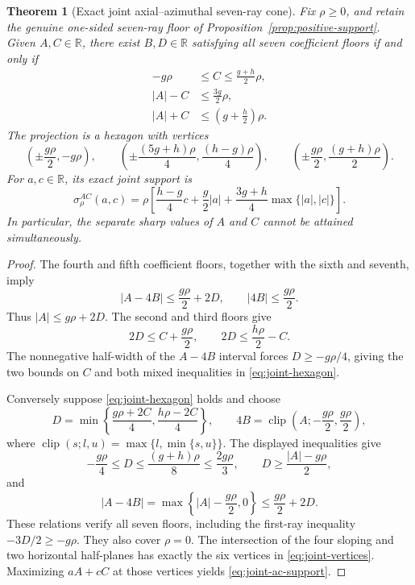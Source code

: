 \documentclass[11pt,a4paper]{article}
\theoremstyle{plain}
\newtheorem{theorem}{Theorem}[section]
\theoremstyle{definition}
\newcommand{\R}{\mathbb{R}}
\begin{document}
\begin{theorem}[Exact joint axial--azimuthal seven-ray cone]
\label{thm:joint-ac-cone}
Fix $\rho\ge0$, and retain the genuine one-sided seven-ray floor of
Proposition~\ref{prop:positive-support}. Given $A,C\in\R$, there exist
$B,D\in\R$ satisfying all seven coefficient floors if and only if
\begin{equation}\label{eq:joint-hexagon}
 \begin{split}
  -g\rho&\le C\le\frac{g+h}{2}\rho,\\
  |A|-C&\le\frac{3g}{2}\rho,\\
  |A|+C&\le\left(g+\frac h2\right)\rho.
 \end{split}
\end{equation}
The projection is a hexagon with vertices
\begin{equation}\label{eq:joint-vertices}
 \left(\pm\frac{g\rho}{2},-g\rho\right),\qquad
 \left(\pm\frac{(5g+h)\rho}{4},\frac{(h-g)\rho}{4}\right),\qquad
 \left(\pm\frac{g\rho}{2},\frac{(g+h)\rho}{2}\right).
\end{equation}
For $a,c\in\R$, its exact joint support is
\begin{equation}\label{eq:joint-ac-support}
 \sigma^{AC}_{\rho}(a,c)=\rho\left[
 \frac{h-g}{4}c+\frac g2|a|
 +\frac{3g+h}{4}\max\{|a|,|c|\}\right].
\end{equation}
In particular, the separate sharp values of $A$ and $C$ cannot
be attained simultaneously.
\end{theorem}

\begin{proof}
The fourth and fifth coefficient floors, together with the sixth and
seventh, imply
\[
 |A-4B|\le\frac{g\rho}{2}+2D,\qquad
 |4B|\le\frac{g\rho}{2}.
\]
Thus $|A|\le g\rho+2D$. The second and third floors give
\[
 2D\le C+\frac{g\rho}{2},\qquad
 2D\le\frac{h\rho}{2}-C.
\]
The nonnegative half-width of the $A-4B$ interval forces
$D\ge-g\rho/4$, giving the two bounds on $C$ and both mixed
inequalities in \eqref{eq:joint-hexagon}.

Conversely suppose \eqref{eq:joint-hexagon} holds and choose
\[
 D=\min\left\{\frac{g\rho+2C}{4},
                    \frac{h\rho-2C}{4}\right\},\qquad
 4B=\operatorname{clip}\left(A;-\frac{g\rho}{2},
                                     \frac{g\rho}{2}\right),
\]
where $\operatorname{clip}(s;l,u)=\max\{l,\min\{s,u\}\}$.
The displayed inequalities give
\[
 -\frac{g\rho}{4}\le D\le\frac{(g+h)\rho}{8}
 \le\frac{2g\rho}{3},\qquad
 D\ge\frac{|A|-g\rho}{2},
\]
and
\[
 |A-4B|=\max\left\{|A|-\frac{g\rho}{2},0\right\}
          \le\frac{g\rho}{2}+2D.
\]
These relations verify all seven floors, including the first-ray
inequality $-3D/2\ge-g\rho$. They also cover $\rho=0$.
The intersection of the four sloping and two horizontal half-planes
has exactly the six vertices in \eqref{eq:joint-vertices}.
Maximizing $aA+cC$ at those vertices yields
\eqref{eq:joint-ac-support}.
\end{proof}
\end{document}

